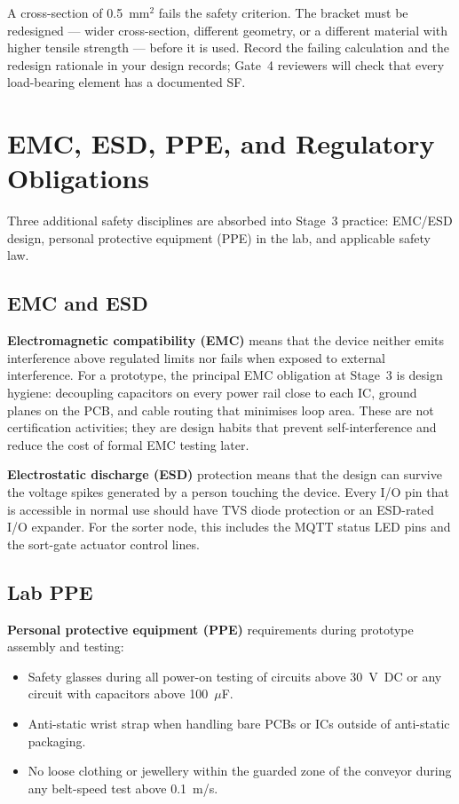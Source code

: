 A cross-section of 0.5~mm$^2$ fails the safety criterion.
The bracket must be redesigned --- wider cross-section, different geometry, or
a different material with higher tensile strength --- before it is used.
Record the failing calculation and the redesign rationale in your design records;
Gate~4 reviewers will check that every load-bearing element has a documented SF.

\section{EMC, ESD, PPE, and Regulatory Obligations}
\label{sec:ch9-absorbed}

Three additional safety disciplines are absorbed into Stage~3 practice: EMC/ESD
design, personal protective equipment (PPE) in the lab, and applicable safety law.

\subsection{EMC and ESD}
\label{sec:ch9-absorbed-emc}

\textbf{Electromagnetic compatibility (EMC)}
means that the device neither emits interference above regulated limits nor fails
when exposed to external interference.
For a prototype, the principal EMC obligation at Stage~3 is design hygiene:
decoupling capacitors on every power rail close to each IC, ground planes on the
PCB, and cable routing that minimises loop area.
These are not certification activities; they are design habits that prevent
self-interference and reduce the cost of formal EMC testing later.

\textbf{Electrostatic discharge (ESD)} protection
means that the design can survive the voltage spikes generated by a person
touching the device.
Every I/O pin that is accessible in normal use should have TVS diode protection
or an ESD-rated I/O expander.
For the sorter node, this includes the MQTT status LED pins and the sort-gate
actuator control lines.

\subsection{Lab PPE}
\label{sec:ch9-absorbed-ppe}

\textbf{Personal protective equipment (PPE)}
requirements during prototype assembly and testing:
\begin{itemize}
  \item Safety glasses during all power-on testing of circuits above 30~V~DC or
        any circuit with capacitors above 100~$\mu$F.
  \item Anti-static wrist strap when handling bare PCBs or ICs outside of
        anti-static packaging.
  \item No loose clothing or jewellery within the guarded zone of the conveyor
        during any belt-speed test above 0.1~m/s.
\end{itemize}

